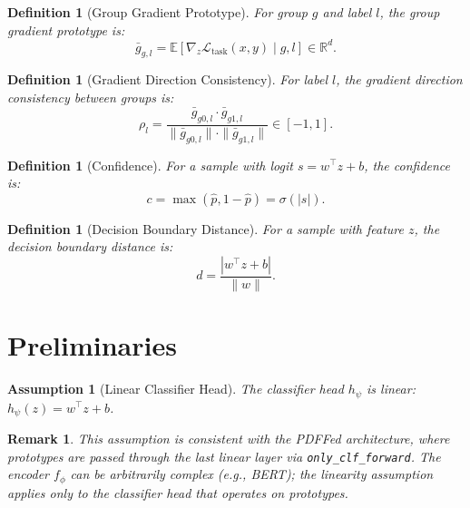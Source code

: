 \documentclass[11pt]{article}
\newtheorem{definition}[theorem]{Definition}
\newtheorem{assumption}[theorem]{Assumption}
\newtheorem{remark}[theorem]{Remark}
\begin{document}
\begin{definition}[Group Gradient Prototype]
    For group $g$ and label $l$, the group gradient prototype is:
    \begin{equation}
        \bar{g}_{g,l} = \mathbb{E}\left[ \nabla_z \mathcal{L}_{\text{task}}(x, y) \mid g, l \right] \in \mathbb{R}^d.
    \end{equation}
\end{definition}

\begin{definition}[Gradient Direction Consistency]
    For label $l$, the gradient direction consistency between groups is:
    \begin{equation}
        \rho_l = \frac{\bar{g}_{g0,l} \cdot \bar{g}_{g1,l}}{\|\bar{g}_{g0,l}\| \cdot \|\bar{g}_{g1,l}\|} \in [-1, 1].
    \end{equation}
\end{definition}

\begin{definition}[Confidence]
    For a sample with logit $s = w^\top z + b$, the confidence is:
    \begin{equation}
        c = \max(\hat{p}, 1-\hat{p}) = \sigma(|s|).
    \end{equation}
\end{definition}

\begin{definition}[Decision Boundary Distance]
    For a sample with feature $z$, the decision boundary distance is:
    \begin{equation}
        d = \frac{|w^\top z + b|}{\|w\|}.
    \end{equation}
\end{definition}


\section{Preliminaries}

\begin{assumption}[Linear Classifier Head]
    \label{ass:linear}
    The classifier head $h_\psi$ is linear: $h_\psi(z) = w^\top z + b$.
\end{assumption}

\begin{remark}
    This assumption is consistent with the PDFFed architecture, where prototypes are passed through the last linear layer via \texttt{only\_clf\_forward}. The encoder $f_\phi$ can be arbitrarily complex (e.g., BERT); the linearity assumption applies only to the classifier head that operates on prototypes.
\end{remark}
\end{document}
